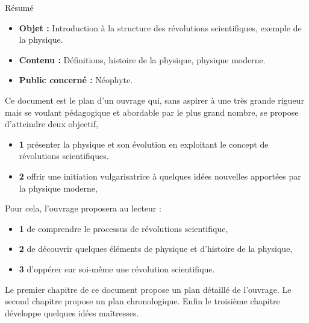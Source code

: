 \begin{center}
\Large
Résumé
\normalsize
\end{center}
\vspace{3cm}
\begin{itemize}[leftmargin=1cm, label=, itemsep=21pt]
\item {\bf Objet : } Introduction à la structure des révolutions scientifiques, exemple de la physique.
\item {\bf Contenu : } Définitions, histoire de la physique, physique moderne.
\item {\bf Public concerné : } Néophyte.
\end{itemize}

\vspace{3cm}

Ce document est le plan d'un ouvrage qui, sans aspirer à une très grande rigueur mais se voulant pédagogique et abordable par le plus grand nombre, se propose d'atteindre deux objectif,

\begin{itemize}[leftmargin=1cm, label=, itemsep=2pt]
\item {\bf 1 } présenter la physique et son évolution en exploitant le concept de révolutions scientifiques.
\item {\bf 2 } offrir une initiation vulgarisatrice à quelques idées nouvelles apportées par la physique moderne,
\end{itemize}

Pour cela, l'ouvrage proposera au lecteur :

\begin{itemize}[leftmargin=1cm, label=, itemsep=2pt]
\item {\bf 1 } de  comprendre le processus de révolutions scientifique,
\item {\bf 2 } de découvrir quelques éléments de physique et d'histoire de la physique,
\item {\bf 3 } d'oppérer sur soi-même une révolution scientifique.
\end{itemize}

Le premier chapitre de ce document propose un plan détaillé de l'ouvrage. Le second chapitre propose un plan chronologique. Enfin le troisième chapitre développe quelques idées maîtresses.



